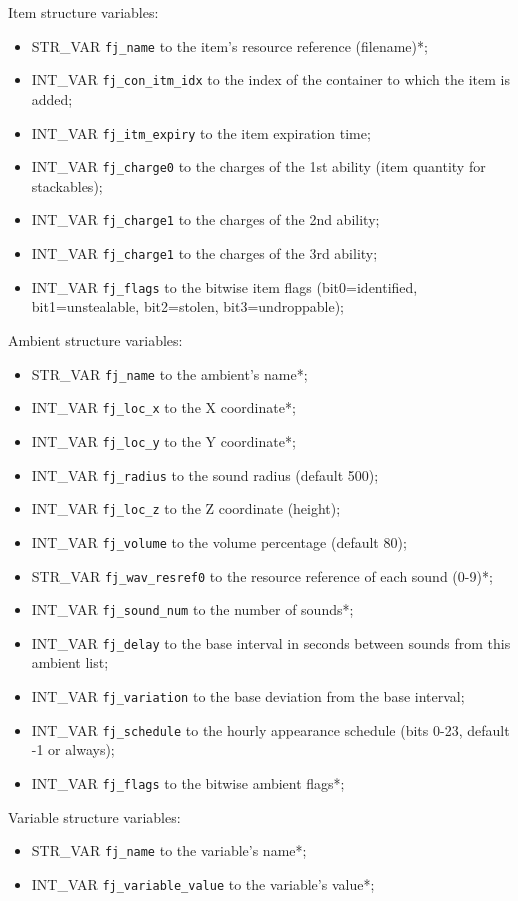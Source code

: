 \documentclass{article}
\begin{document}
Item structure variables:
\begin{itemize}
\item STR_VAR \verb+fj_name+ to the item's resource reference (filename)*;
\item INT_VAR \verb+fj_con_itm_idx+ to the index of the container to which the item is added;
\item INT_VAR \verb+fj_itm_expiry+ to the item expiration time;
\item INT_VAR \verb+fj_charge0+ to the charges of the 1st ability (item quantity for stackables);
\item INT_VAR \verb+fj_charge1+ to the charges of the 2nd ability;
\item INT_VAR \verb+fj_charge1+ to the charges of the 3rd ability;
\item INT_VAR \verb+fj_flags+ to the bitwise item flags (bit0=identified, bit1=unstealable, bit2=stolen, bit3=undroppable);
\end{itemize}
Ambient structure variables:
\begin{itemize}
\item STR_VAR \verb+fj_name+ to the ambient's name*;
\item INT_VAR \verb+fj_loc_x+ to the X coordinate*;
\item INT_VAR \verb+fj_loc_y+ to the Y coordinate*;
\item INT_VAR \verb+fj_radius+ to the sound radius (default 500);
\item INT_VAR \verb+fj_loc_z+ to the Z coordinate (height);
\item INT_VAR \verb+fj_volume+ to the volume percentage (default 80);
\item STR_VAR \verb+fj_wav_resref0+ to the resource reference of each sound (0-9)*;
\item INT_VAR \verb+fj_sound_num+ to the number of sounds*;
\item INT_VAR \verb+fj_delay+ to the base interval in seconds between sounds from this ambient list;
\item INT_VAR \verb+fj_variation+ to the base deviation from the base interval;
\item INT_VAR \verb+fj_schedule+ to the hourly appearance schedule (bits 0-23, default -1 or always);
\item INT_VAR \verb+fj_flags+ to the bitwise ambient flags*;
\end{itemize}
Variable structure variables:
\begin{itemize}
\item STR_VAR \verb+fj_name+ to the variable's name*;
\item INT_VAR \verb+fj_variable_value+ to the variable's value*;
\end{itemize}
\end{document}
